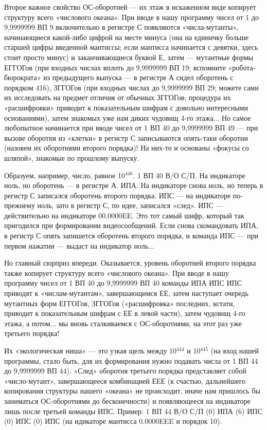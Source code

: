 \documentclass[11pt,a4paper,oneside]{article}
\begin{document}
Второе важное свойство ОС-оборотней — их этаж в искаженном виде копирует структуру всего «числового океана». При вводе в нашу программу чисел от 1 до 9,9999999 ВП 9 включительно в регистре С появляются «числа-мутанты», начинающиеся какой-либо цифрой на месте минуса (она на единичку больше старшей цифры введенной мантиссы; если мантисса начинается с девятки, здесь стоит просто минус) и заканчивающиеся буквой Е, затем — мутантные формы ЕГГОГов (при входных числах вплоть до 9,9999999 ВП 19; вспомните «робота-бюрократа» из предыдущего выпуска — в регистре А сидел оборотень с порядком 416), ЗГГОГов (при входных числах до 9,9999999 ВП 29; можете сами их исследовать на предмет отличия от обычных ЗГГОГов; процедура их «расшифровки» приводит к показательным шифрам с довольно интересными основаниями), затем знакомых уже нам диких чудовищ 4-го этажа... Но самое любопытное начинается при вводе чисел от 1 ВП 40 до 9,9999999 ВП 49 — при вызове оборотня из «клетки» в регистр С записываются опять-таки оборотни (назовем их оборотнями второго порядка)! На них-то и основаны «фокусы со шляпой», знакомые по прошлому выпуску.

Образуем, например, число, равное 10$^{440}$. 1 ВП 40 В/О С/П. На индикаторе ноль, но оборотень — в регистре А. ИПА. На индикаторе снова ноль, но теперь в регистр С записался оборотень второго порядка. ИПС — на индикаторе по-прежнему ноль, зато в регистр С, по идее, записался «след». ИПС — действительно на индикаторе 00.0000EE. Это тот самый шифр, который так пригодился при формировании видеосообщений. Если снова скомандовать ИПА, в регистр С опять запишется оборотень второго порядка, и команда ИПС — при первом нажатии — выдаст на индикатор ноль...

Но главный сюрприз впереди. Оказывается, уровень оборотней второго порядка также копирует структуру всего «числового океана». При вводе в нашу программу чисел от 1 ВП 40 до 9,9999999 ВП 40 команды ИПА ИПС ИПС приводят к «числам-мутантам», завершающимся ЕЕ, затем наступает очередь мутантных форм ЕГГОГов, ЗГГОГов («расшифровка» последних, кстати, приводит к показательным шифрам с ЕЕ в левой части), затем чудовищ 4-го этажа, а потом... мы вновь сталкиваемся с ОС-оборотнями, на этот раз уже третьего порядка!

Их «экологическая ниша» — это узкая щель между 10$^{444}$ и 10$^{445}$ (на вход нашей программы, стало быть, для их формирования нужно подавать числа от 1 ВП 44 до 9,9999999 ВП 44). «След» оборотня третьего порядка представляет собой «число-мутант», завершающееся комбинацией ЕЕЕ (к счастью, дальнейшего копирования структуры нашего «океана» не происходит, иначе нам пришлось бы заниматься ОС-оборотнями до бесконечности) и появляющееся на индикаторе лишь после третьей команды ИПС. Пример: 1 ВП 44 В/О С/П (0) ИПА (6) ИПС (0) ИПС (0) ИПС (на идикаторе мантисса 0.0000EEE и порядок 10).
\end{document}
